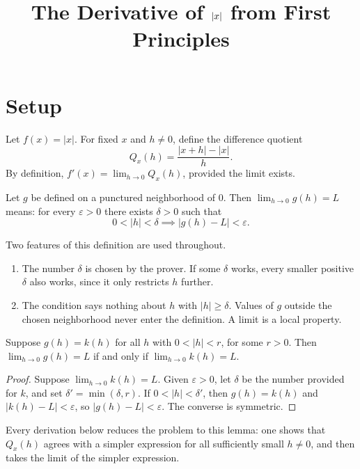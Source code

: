\documentclass{essay}
\title{The Derivative of $\abs{x}$ from First Principles}
\author{}
\date{}
\newcommand{\abs}[1]{\lvert #1 \rvert}
\begin{document}
\maketitle

\section{Setup}

Let $f(x) = \abs{x}$. For fixed $x$ and $h \neq 0$, define the difference quotient
\[
  Q_x(h) = \frac{\abs{x+h} - \abs{x}}{h}.
\]
By definition, $f'(x) = \lim_{h \to 0} Q_x(h)$, provided the limit exists.

\begin{definition}
  Let $g$ be defined on a punctured neighborhood of $0$. Then
  $\lim_{h \to 0} g(h) = L$ means: for every $\varepsilon > 0$ there exists
  $\delta > 0$ such that
  \[
    0 < \abs{h} < \delta \implies \abs{g(h) - L} < \varepsilon.
  \]
\end{definition}

Two features of this definition are used throughout.

\begin{enumerate}
  \item The number $\delta$ is chosen by the prover. If some $\delta$ works,
        every smaller positive $\delta$ also works, since it only restricts
        $h$ further.
  \item The condition says nothing about $h$ with $\abs{h} \geq \delta$.
        Values of $g$ outside the chosen neighborhood never enter the
        definition. A limit is a local property.
\end{enumerate}

\begin{lemma}\label{lem:local}
  Suppose $g(h) = k(h)$ for all $h$ with $0 < \abs{h} < r$, for some $r > 0$.
  Then $\lim_{h \to 0} g(h) = L$ if and only if $\lim_{h \to 0} k(h) = L$.
\end{lemma}

\begin{proof}
  Suppose $\lim_{h\to 0} k(h) = L$. Given $\varepsilon > 0$, let $\delta$ be
  the number provided for $k$, and set $\delta' = \min(\delta, r)$. If
  $0 < \abs{h} < \delta'$, then $g(h) = k(h)$ and $\abs{k(h) - L} < \varepsilon$,
  so $\abs{g(h) - L} < \varepsilon$. The converse is symmetric.
\end{proof}

Every derivation below reduces the problem to this lemma: one shows that
$Q_x(h)$ agrees with a simpler expression for all sufficiently small $h \neq 0$,
and then takes the limit of the simpler expression.
\end{document}
